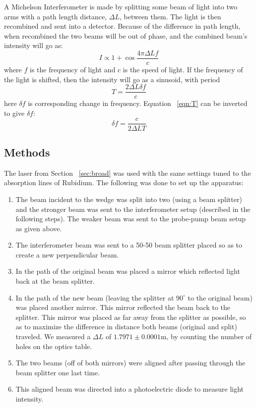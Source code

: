 \documentclass[paper=a4, fontsize=11pt]{scrartcl} %
\numberwithin{equation}{section}
\numberwithin{figure}{section}
\numberwithin{table}{section}
\begin{document}
A Michelson Interferometer is made by splitting some beam of light
into two arms with a path length distance, $\Delta L$, between
them. The light is then recombined and sent into a detector. Because
of the difference in path length, when recombined the two beams will
be out of phase, and the combined beam's intensity will go as:
\begin{equation}
I \propto 1 + \cos \frac{4\pi \Delta Lf}{c}
\end{equation}
where $f$ is the frequency of light and $c$ is the speed of light. If
the frequency of the light is shifted, then the intensity will go as a
sinusoid, with period 
\begin{equation}
\label{eqn:T}
T = \frac{2\Delta L \delta f}{c}
\end{equation}
here $\delta f$ is corresponding change in frequency. Equation
~\ref{eqn:T} can be inverted to give $\delta f$:
\begin{equation}
\label{eqn:df}
\delta f = \frac{c}{2\Delta L T}
\end{equation}

\subsection{Methods}

The laser from Section ~\ref{sec:broad} was used with the same
settings tuned to the absorption lines of Rubidium. The following was
done to set up the apparatus:
\begin{enumerate}
\item The beam incident to the wedge was split into two (using a beam splitter) and the stronger beam was sent to the interferometer setup (described in the following steps). The weaker beam was sent to the probe-pump beam setup as given above.
\item The interferometer beam was sent to a 50-50 beam splitter placed so as to create a new perpendicular beam.
\item In the path of the original beam was placed a mirror which reflected light back at the beam splitter.
\item In the path of the new beam (leaving the splitter at $90^\circ$
  to the original beam) was placed another mirror. This mirror
  reflected the beam back to the splitter. This mirror was placed as
  far away from the splitter as possible, so as to maximize the
  difference in distance both beams (original and split) traveled. We
  measured a $\Delta L$ of $1.7971 \pm 0.0001$m, by counting the
  number of holes on the optics table. 
\item The two beams (off of both mirrors) were aligned after passing through the beam splitter one last time.
\item This aligned beam was directed into a photoelectric diode to measure light intensity.
\end{enumerate}
\end{document}
